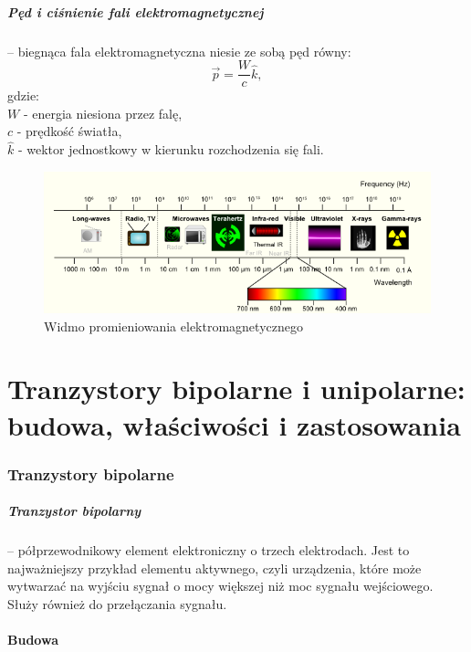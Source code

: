 \documentclass[a4paper,twoside]{report}
\begin{document}
\paragraph{Pęd i ciśnienie fali elektromagnetycznej} – biegnąca fala elektromagnetyczna niesie ze sobą pęd równy:
\begin{equation}
\overrightarrow{p} = \dfrac{W}{c} \hat{k},
\end{equation}
gdzie: \\
$W$ - energia niesiona przez falę,\\
$c$ - prędkość światła,\\
$\hat{k}$ - wektor jednostkowy w kierunku rozchodzenia się fali.

\begin{figure}[htbp]
\centering
\includegraphics[width=\linewidth]{obrazy/spectrum.png}
\caption{Widmo promieniowania elektromagnetycznego}
\label{rys:widmo}
\end{figure}

\chapter{Tranzystory bipolarne i unipolarne: budowa, właściwości i zastosowania}


\subsection{Tranzystory bipolarne}  
\paragraph{Tranzystor bipolarny} – półprzewodnikowy element elektroniczny o trzech elektrodach. Jest to najważniejszy przykład elementu aktywnego, czyli urządzenia, które może wytwarzać na wyjściu sygnał o mocy większej niż moc sygnału wejściowego. Służy również do przełączania sygnału.

\subsubsection{Budowa}
\end{document}
